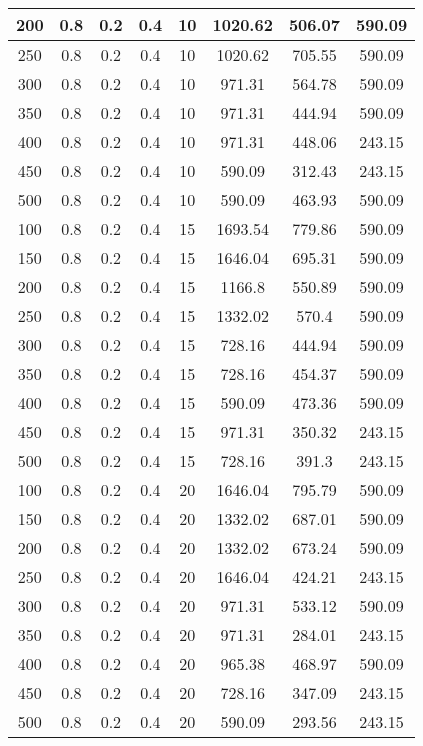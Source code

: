 \documentclass[a4paper, 12pt]{extreport}
\begin{document}
\begin{itemize}
\begin{longtable}{|c|c|c|c|c|c|c|c|}
			200 & 0.8 & 0.2 & 0.4 & 10 & 1020.62 & 506.07 & 590.09 \\\hline
			250 & 0.8 & 0.2 & 0.4 & 10 & 1020.62 & 705.55 & 590.09 \\\hline
			300 & 0.8 & 0.2 & 0.4 & 10 & 971.31 & 564.78 & 590.09 \\\hline
			350 & 0.8 & 0.2 & 0.4 & 10 & 971.31 & 444.94 & 590.09 \\\hline
			400 & 0.8 & 0.2 & 0.4 & 10 & 971.31 & 448.06 & 243.15 \\\hline
			450 & 0.8 & 0.2 & 0.4 & 10 & 590.09 & 312.43 & 243.15 \\\hline
			500 & 0.8 & 0.2 & 0.4 & 10 & 590.09 & 463.93 & 590.09 \\\hline
			100 & 0.8 & 0.2 & 0.4 & 15 & 1693.54 & 779.86 & 590.09 \\\hline
			150 & 0.8 & 0.2 & 0.4 & 15 & 1646.04 & 695.31 & 590.09 \\\hline
			200 & 0.8 & 0.2 & 0.4 & 15 & 1166.8 & 550.89 & 590.09 \\\hline
			250 & 0.8 & 0.2 & 0.4 & 15 & 1332.02 & 570.4 & 590.09 \\\hline
			300 & 0.8 & 0.2 & 0.4 & 15 & 728.16 & 444.94 & 590.09 \\\hline
			350 & 0.8 & 0.2 & 0.4 & 15 & 728.16 & 454.37 & 590.09 \\\hline
			400 & 0.8 & 0.2 & 0.4 & 15 & 590.09 & 473.36 & 590.09 \\\hline
			450 & 0.8 & 0.2 & 0.4 & 15 & 971.31 & 350.32 & 243.15 \\\hline
			500 & 0.8 & 0.2 & 0.4 & 15 & 728.16 & 391.3 & 243.15 \\\hline
			100 & 0.8 & 0.2 & 0.4 & 20 & 1646.04 & 795.79 & 590.09 \\\hline
			150 & 0.8 & 0.2 & 0.4 & 20 & 1332.02 & 687.01 & 590.09 \\\hline
			200 & 0.8 & 0.2 & 0.4 & 20 & 1332.02 & 673.24 & 590.09 \\\hline
			250 & 0.8 & 0.2 & 0.4 & 20 & 1646.04 & 424.21 & 243.15 \\\hline
			300 & 0.8 & 0.2 & 0.4 & 20 & 971.31 & 533.12 & 590.09 \\\hline
			350 & 0.8 & 0.2 & 0.4 & 20 & 971.31 & 284.01 & 243.15 \\\hline
			400 & 0.8 & 0.2 & 0.4 & 20 & 965.38 & 468.97 & 590.09 \\\hline
			450 & 0.8 & 0.2 & 0.4 & 20 & 728.16 & 347.09 & 243.15 \\\hline
			500 & 0.8 & 0.2 & 0.4 & 20 & 590.09 & 293.56 & 243.15 \\\hline

\end{longtable}
\end{itemize}
\end{document}
